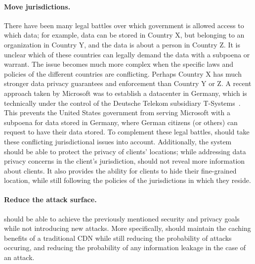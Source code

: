 \paragraph{Move jurisdictions.} There have been many legal battles over which government is allowed access 
to which data; for example, data can be stored in Country X, but belonging to an organization in Country Y, and 
the data is about a person in Country Z.  It is unclear which of these countries can legally demand 
the data with a subpoena or warrant.  The issue becomes much more complex when the specific laws 
and policies of the different countries are conflicting.  Perhaps Country X has much stronger data privacy 
guarantees and enforcement than Country Y or Z.  A recent approach taken by Microsoft was to establish 
a datacenter in Germany, which is technically under the control of the Deutsche Telekom subsidiary 
T-Systems~\cite{microsoft_germany}.  This prevents the United States government from serving Microsoft with a subpoena 
for data stored in Germany, where German citizens (or others) can request to have their data stored.
  To complement these legal battles, \system{} should take 
these conflicting jurisdictional issues into account.  Additionally, the system should be able to protect 
the privacy of clients' locations; while addressing data privacy concerns in the client's jurisdiction, \system{} 
should not reveal more information about clients.  It also provides the ability for clients 
to hide their fine-grained location, while still following the policies of the jurisdictions in which 
they reside.

\paragraph{Reduce the attack surface.} \system{} should be able to achieve the previously mentioned security 
and privacy goals while not introducing new attacks.  More specifically, \system{} should maintain the 
caching benefits of a traditional CDN while still reducing 
the probability of attacks occuring, and reducing the probability of any information leakage in 
the case of an attack.


